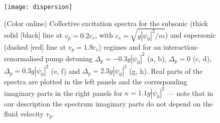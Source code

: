 %
\begin{figure}[tb]\centering
\texttt{[image: dispersion]} %
\caption{
%
(Color online) Collective excitation spectra for the subsonic (thick
solid [black] line at $v_p=0.2 c_s$, with $c_s=\sqrt{g|\psi_0|^2/m}$)
and supersonic (dashed [red] line at $v_p=1.9 c_s$) regimes and for an
interaction-renormalised pump detuning $\Delta_p=-0.3 g|\psi_0|^2$ (a,
b), $\Delta_p = 0$ (c, d), $\Delta_p=0.3g|\psi_0|^2$ (e, f) and
$\Delta_p=2.3g|\psi_0|^2$ (g, h). Real parts of the spectra are
plotted in the left panels and the corresponding imaginary parts in
the right panels for $\kappa=1.1 g|\psi_0|^2$ --- note that in our
description the spectrum imaginary parts do not depend on the fluid
velocity $v_p$.
%
}\label{fig:spect}
\end{figure}
%


